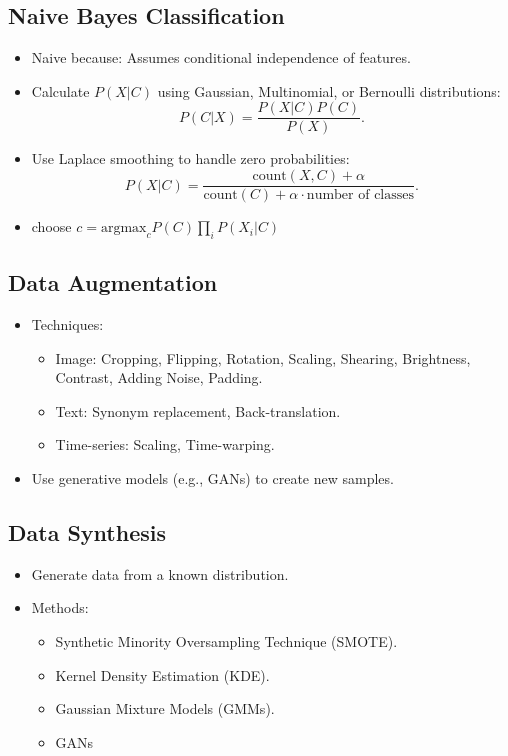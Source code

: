 \documentclass[12pt,a4paper]{article}
\begin{document}
\subsection{Naive Bayes Classification}
\begin{itemize}
    \item Naive because: Assumes conditional independence of features.
    \item Calculate $P(X|C)$ using Gaussian, Multinomial, or Bernoulli distributions:
    \[ P(C|X) = \frac{P(X|C) P(C)}{P(X)}. \]
    \item Use Laplace smoothing to handle zero probabilities:
    \[ P(X|C) = \frac{\text{count}(X, C) + \alpha}{\text{count}(C) + \alpha \cdot \text{number of classes}}. \]
    \item choose $c= \text{argmax}_c P(C) \prod_i P(X_i|C)$
\end{itemize}

\subsection{Data Augmentation}
\begin{itemize}
    \item Techniques:
    \begin{itemize}
        \item Image: Cropping, Flipping, Rotation, Scaling, Shearing, Brightness, Contrast, Adding Noise, Padding.
        \item Text: Synonym replacement, Back-translation.
        \item Time-series: Scaling, Time-warping.
    \end{itemize}
    \item Use generative models (e.g., GANs) to create new samples.
\end{itemize}

\subsection{Data Synthesis}
\begin{itemize}
    \item Generate data from a known distribution.
    \item Methods:
    \begin{itemize}
        \item Synthetic Minority Oversampling Technique (SMOTE).
        \item Kernel Density Estimation (KDE).
        \item Gaussian Mixture Models (GMMs).
        \item GANs
    \end{itemize}
\end{itemize}
\end{document}
